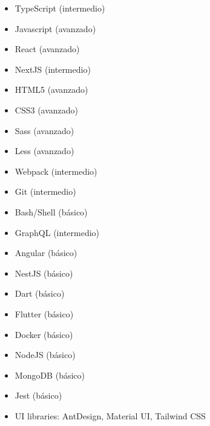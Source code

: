 
\begin{itemize}
    \item TypeScript (intermedio)
    \item Javascript (avanzado)
    \item React (avanzado)
    \item NextJS (intermedio)
    \item HTML5 (avanzado)
    \item CSS3 (avanzado)
    \item Sass (avanzado)
    \item Less (avanzado)
    \item Webpack (intermedio)
    \item Git (intermedio)
    \item Bash/Shell (básico)
    \item GraphQL (intermedio)
    \item Angular (básico)
    \item NestJS (básico)
    \item Dart (básico)
    \item Flutter (básico)
    \item Docker (básico)
    \item NodeJS (básico)
    \item MongoDB (básico)
    \item Jest (básico)
    \item UI libraries: AntDesign, Material UI, Tailwind CSS
\end{itemize}

